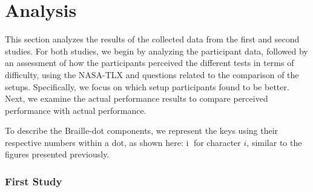 \chapter{Analysis}
\label{ch:Analysis}



This section analyzes the results of the collected data from the first and second studies. For both studies, we begin by analyzing the participant data, followed by an assessment of how the participants perceived the different tests in terms of difficulty, using the NASA-TLX and questions related to the comparison of the setups. Specifically, we focus on which setup participants found to be better. Next, we examine the actual performance results to compare perceived performance with actual performance.

To describe the Braille-dot components, we represent the keys using their respective numbers within a dot, as shown here: \textcircled{i} for character $i$, similar to the figures presented previously.

\subsection{First Study}

